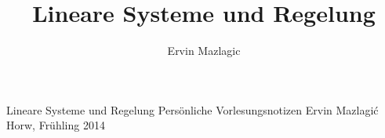 \documentclass[a4paper,
               10pt,
               fleqn]{article}
\author{Ervin Mazlagic}
\title{Lineare Systeme und Regelung}
\begin{document}
	 {Lineare Systeme und Regelung}
         {Persönliche Vorlesungsnotizen}
         {Ervin Mazlagi\'c}
         {Horw, Frühling 2014}

\tableofcontents
\newpage

 
	 
\end{document}
